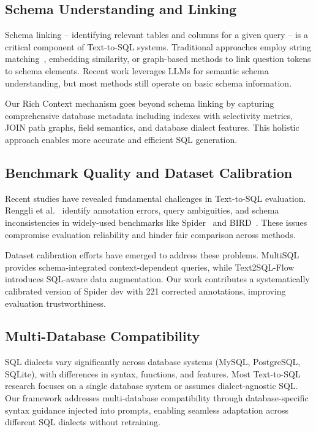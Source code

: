 \subsection{Schema Understanding and Linking}

Schema linking -- identifying relevant tables and columns for a given query -- is a critical component of Text-to-SQL systems. Traditional approaches employ string matching~\cite{lei2020re}, embedding similarity, or graph-based methods to link question tokens to schema elements. Recent work leverages LLMs for semantic schema understanding, but most methods still operate on basic schema information.

Our Rich Context mechanism goes beyond schema linking by capturing comprehensive database metadata including indexes with selectivity metrics, JOIN path graphs, field semantics, and database dialect features. This holistic approach enables more accurate and efficient SQL generation.

\subsection{Benchmark Quality and Dataset Calibration}

Recent studies have revealed fundamental challenges in Text-to-SQL evaluation. Renggli et al.~\cite{renggli2025fundamental} identify annotation errors, query ambiguities, and schema inconsistencies in widely-used benchmarks like Spider~\cite{yu2018spider} and BIRD~\cite{li2023bird}. These issues compromise evaluation reliability and hinder fair comparison across methods.

Dataset calibration efforts have emerged to address these problems. MultiSQL~\cite{li2024multisql} provides schema-integrated context-dependent queries, while Text2SQL-Flow~\cite{chang2025text2sql} introduces SQL-aware data augmentation. Our work contributes a systematically calibrated version of Spider dev with 221 corrected annotations, improving evaluation trustworthiness.

\subsection{Multi-Database Compatibility}

SQL dialects vary significantly across database systems (MySQL, PostgreSQL, SQLite), with differences in syntax, functions, and features. Most Text-to-SQL research focuses on a single database system or assumes dialect-agnostic SQL. Our framework addresses multi-database compatibility through database-specific syntax guidance injected into prompts, enabling seamless adaptation across different SQL dialects without retraining.
